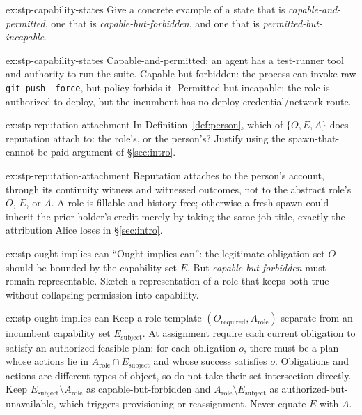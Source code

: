 \documentclass[11pt,a4paper]{article}
\theoremstyle{definition}
\begin{document}
\begin{pdexercise}[kind=Check,rating=1]{ex:stp-capability-states}
Give a concrete example of a state that is \emph{capable-and-permitted}, one
that is \emph{capable-but-forbidden}, and one that is
\emph{permitted-but-incapable}.
\end{pdexercise}
\begin{pdsolution}{ex:stp-capability-states}
Capable-and-permitted: an agent has a test-runner tool and authority to run
the suite. Capable-but-forbidden: the process can invoke raw
\texttt{git push --force}, but policy forbids it. Permitted-but-incapable: the
role is authorized to deploy, but the incumbent has no deploy
credential/network route.
\end{pdsolution}
\begin{pdexercise}[kind=Trace,rating=2]{ex:stp-reputation-attachment}
In Definition~\ref{def:person}, which of $\{O,E,A\}$ does reputation attach to:
the role's, or the person's? Justify using the spawn-that-cannot-be-paid
argument of \S\ref{sec:intro}.
\end{pdexercise}
\begin{pdsolution}{ex:stp-reputation-attachment}
Reputation attaches to the person's account, through its continuity witness and
witnessed outcomes, not to the abstract role's $O$, $E$, or $A$. A role is fillable and
history-free; otherwise a fresh spawn could inherit the prior holder's credit
merely by taking the same job title, exactly the attribution Alice loses in
\S\ref{sec:intro}.
\end{pdsolution}
\begin{pdexercise}[kind=Open,rating=3]{ex:stp-ought-implies-can}
``Ought implies can'': the legitimate obligation set $O$ should be bounded by
the capability set $E$. But \emph{capable-but-forbidden} must remain
representable. Sketch a representation of a role that keeps both true without
collapsing permission into capability.
\end{pdexercise}
\begin{pdsolution}{ex:stp-ought-implies-can}
Keep a role template $(O_{\text{required}}, A_{\text{role}})$ separate from an
incumbent capability set $E_{\text{subject}}$. At assignment require each
current obligation to satisfy
an authorized feasible plan: for each obligation $o$, there must be a plan
whose actions lie in $A_{\text{role}}\cap E_{\text{subject}}$ and whose
success satisfies $o$. Obligations and actions are different types of object,
so do not take their set intersection directly. Keep
$E_{\text{subject}} \setminus A_{\text{role}}$ as capable-but-forbidden and
$A_{\text{role}} \setminus E_{\text{subject}}$ as authorized-but-unavailable,
which triggers provisioning or reassignment. Never equate $E$ with $A$.
\end{pdsolution}
\end{document}
